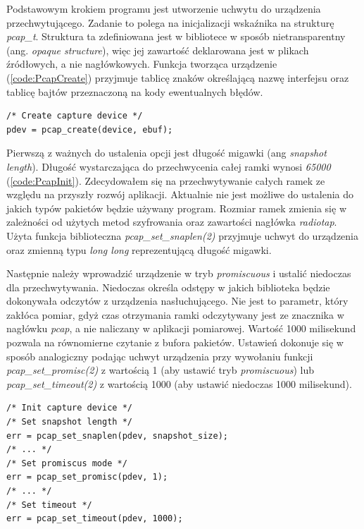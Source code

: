 Podstawowym krokiem programu jest utworzenie uchwytu do urządzenia przechwytującego. Zadanie to polega na inicjalizacji wskaźnika na strukturę \emph{pcap\_t}. Struktura ta zdefiniowana jest w bibliotece w sposób nietransparentny (ang. \emph{opaque structure}), więc jej zawartość deklarowana jest w plikach źródłowych, a nie nagłówkowych. Funkcja tworząca urządzenie (\ref{code:PcapCreate}) przyjmuje tablicę znaków określającą nazwę interfejsu oraz tablicę bajtów przeznaczoną na kody ewentualnych błędów. 

\begin{lstlisting}[frame=tb]
/* Create capture device */
pdev = pcap_create(device, ebuf);
\end{lstlisting}

Pierwszą z ważnych do ustalenia opcji jest długość migawki (ang \emph{snapshot length}). Długość wystarczająca do przechwycenia całej ramki wynosi \emph{65000} (\ref{code:PcapInit}). Zdecydowałem się na przechwytywanie całych ramek ze względu na przyszły rozwój aplikacji. Aktualnie nie jest możliwe do ustalenia do jakich typów pakietów będzie używany program. Rozmiar ramek zmienia się w zależności od użytych metod szyfrowania oraz zawartości nagłówka \emph{radiotap}. Użyta funkcja biblioteczna \emph{pcap\_set\_snaplen(2)} przyjmuje uchwyt do urządzenia oraz zmienną typu \emph{long long} reprezentującą długość migawki. 


Następnie należy wprowadzić urządzenie w tryb \emph{promiscuous} i ustalić niedoczas dla przechwytywania. Niedoczas określa odstępy w jakich biblioteka będzie dokonywała odczytów z urządzenia nasłuchującego. Nie jest to parametr, który zakłóca pomiar, gdyż czas otrzymania ramki odczytywany jest ze znacznika w nagłówku \emph{pcap}, a nie naliczany w aplikacji pomiarowej. Wartość 1000 milisekund pozwala na równomierne czytanie z bufora pakietów. Ustawień dokonuje się w sposób analogiczny podając uchwyt urządzenia przy wywołaniu funkcji \emph{pcap\_set\_promisc(2)} z wartością 1 (aby ustawić tryb \emph{promiscuous}) lub \emph{pcap\_set\_timeout(2)} z wartością 1000 (aby ustawić niedoczas 1000 milisekund).

\begin{lstlisting}[frame=tb]
/* Init capture device */
/* Set snapshot length */
err = pcap_set_snaplen(pdev, snapshot_size);
/* ... */
/* Set promiscus mode */
err = pcap_set_promisc(pdev, 1);
/* ... */
/* Set timeout */
err = pcap_set_timeout(pdev, 1000);
\end{lstlisting}

